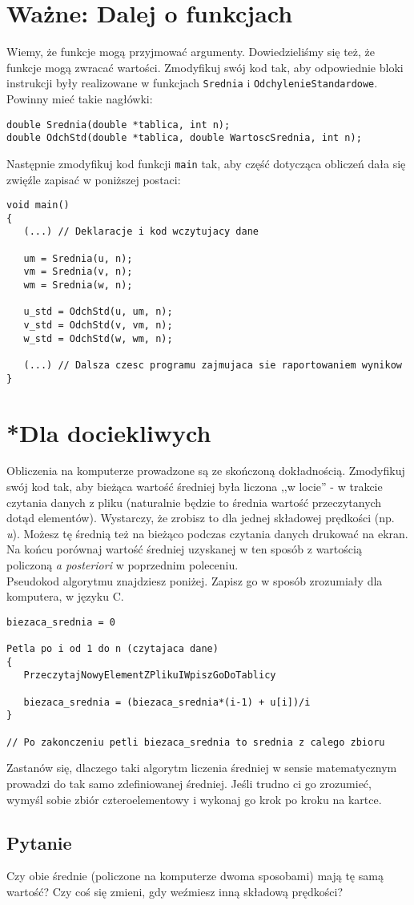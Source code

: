 \documentclass{instrukcja}
\begin{document}
\section{Ważne: Dalej o funkcjach}
Wiemy, że funkcje mogą przyjmować argumenty. Dowiedzieliśmy się też, że funkcje mogą zwracać wartości. Zmodyfikuj swój kod tak, aby odpowiednie bloki instrukcji były realizowane w funkcjach {\tt Srednia} i {\tt OdchylenieStandardowe}. Powinny mieć takie nagłówki:
\begin{verbatim}
double Srednia(double *tablica, int n);
double OdchStd(double *tablica, double WartoscSrednia, int n);
\end{verbatim}
Następnie zmodyfikuj kod funkcji {\tt main} tak, aby część dotycząca obliczeń dała się zwięźle zapisać w poniższej postaci:
\begin{verbatim}
void main()
{
   (...) // Deklaracje i kod wczytujacy dane

   um = Srednia(u, n);
   vm = Srednia(v, n);
   wm = Srednia(w, n);

   u_std = OdchStd(u, um, n);
   v_std = OdchStd(v, vm, n);
   w_std = OdchStd(w, wm, n);

   (...) // Dalsza czesc programu zajmujaca sie raportowaniem wynikow
}
\end{verbatim}
\section*{*Dla dociekliwych}
Obliczenia na komputerze prowadzone są ze skończoną dokładnością. Zmodyfikuj swój kod tak, aby bieżąca wartość średniej była liczona ,,w locie'' - w trakcie czytania danych z pliku (naturalnie będzie to średnia wartość przeczytanych dotąd elementów). Wystarczy, że zrobisz to dla jednej składowej prędkości (np. {\it u}). Możesz tę średnią też na bieżąco podczas czytania danych drukować na ekran. Na końcu porównaj wartość średniej uzyskanej w ten sposób z wartością policzoną {\it a posteriori} w poprzednim poleceniu.\\
Pseudokod algorytmu znajdziesz poniżej. Zapisz go w sposób zrozumiały dla komputera, w języku C.
\begin{verbatim}
biezaca_srednia = 0

Petla po i od 1 do n (czytajaca dane)
{
   PrzeczytajNowyElementZPlikuIWpiszGoDoTablicy

   biezaca_srednia = (biezaca_srednia*(i-1) + u[i])/i
}

// Po zakonczeniu petli biezaca_srednia to srednia z calego zbioru
\end{verbatim}
Zastanów się, dlaczego taki algorytm liczenia średniej w sensie matematycznym prowadzi do tak samo zdefiniowanej średniej. Jeśli trudno ci go zrozumieć, wymyśl sobie zbiór czteroelementowy i wykonaj go krok po kroku na kartce.
\subsection*{Pytanie}
Czy obie średnie (policzone na komputerze dwoma sposobami) mają tę samą wartość? Czy coś się zmieni, gdy weźmiesz inną składową prędkości?
\end{document}
